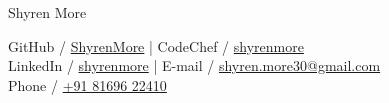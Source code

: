 \documentclass[a4,10pt]{article}
\begin{document}

\begin{flushleft}

    \begin{minipage}[b]{0.5\textwidth}
    {\Huge Shyren More} \\ 
    \end{minipage}%

    GitHub / \href{https://github.com/ShyrenMore}{ ShyrenMore} | 
    CodeChef / \href{https://www.codechef.com/users/shyren_more}{shyren\textunderscore more}  \\
    \vspace{0.1cm}
    LinkedIn / \href{https://linkedin.com/in/shyrenmore/}{ shyrenmore} |     E-mail / \href{mailto:shyren.more30@gmail.com}{shyren.more30@gmail.com} \\
    \vspace{0.1cm}
    Phone / \href{tel:8169622410}{+91 81696 22410}
    
\end{flushleft}
             
             
    
\end{document}

